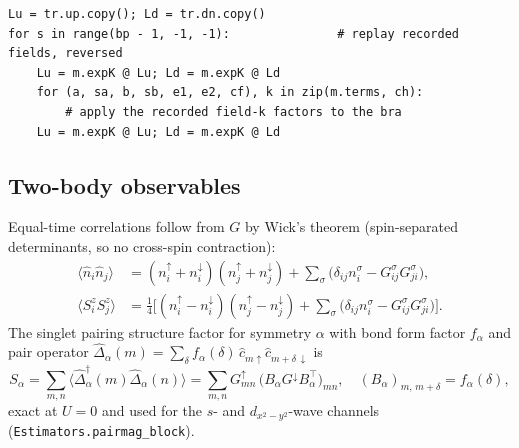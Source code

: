 \documentclass[11pt]{article}
\newcommand{\ann}[1]{\hat{c}^{\phantom{\dagger}}_{#1}}
\begin{document}
\begin{lstlisting}[caption={Back-propagated bra (\texttt{Estimators.bp\_bra}).}]
Lu = tr.up.copy(); Ld = tr.dn.copy()
for s in range(bp - 1, -1, -1):               # replay recorded fields, reversed
    Lu = m.expK @ Lu; Ld = m.expK @ Ld
    for (a, sa, b, sb, e1, e2, cf), k in zip(m.terms, ch):
        # apply the recorded field-k factors to the bra
    Lu = m.expK @ Lu; Ld = m.expK @ Ld
\end{lstlisting}

\subsection{Two-body observables}
Equal-time correlations follow from $G$ by Wick's theorem (spin-separated
determinants, so no cross-spin contraction):
\begin{align}
\langle \hat n_i \hat n_j\rangle &=
(n^{\uparrow}_i+n^{\downarrow}_i)(n^{\uparrow}_j+n^{\downarrow}_j)
+\!\!\sum_{\sigma}\!\big(\delta_{ij}n^{\sigma}_i - G^{\sigma}_{ij}G^{\sigma}_{ji}\big),\\
\langle S^z_i S^z_j\rangle &= \tfrac14\Big[
(n^{\uparrow}_i-n^{\downarrow}_i)(n^{\uparrow}_j-n^{\downarrow}_j)
+\!\!\sum_{\sigma}\!\big(\delta_{ij}n^{\sigma}_i - G^{\sigma}_{ij}G^{\sigma}_{ji}\big)\Big].
\end{align}
The singlet pairing structure factor for symmetry $\alpha$ with bond form factor
$f_\alpha$ and pair operator
$\hat\Delta_\alpha(m)=\sum_{\delta}f_\alpha(\delta)\,\ann{m\uparrow}\ann{m+\delta\,\downarrow}$
is
\begin{equation}
S_\alpha=\sum_{m,n}\langle\hat\Delta^{\dagger}_\alpha(m)\hat\Delta_\alpha(n)\rangle
=\sum_{m,n} G^{\uparrow}_{mn}\,\big(B_\alpha G^{\downarrow}B_\alpha^{\!\top}\big)_{mn},
\quad (B_\alpha)_{m,\,m+\delta}=f_\alpha(\delta),
\label{eq:pair}
\end{equation}
exact at $U=0$ and used for the $s$- and $d_{x^2-y^2}$-wave channels
(\texttt{Estimators.pairmag\_block}).
\end{document}
